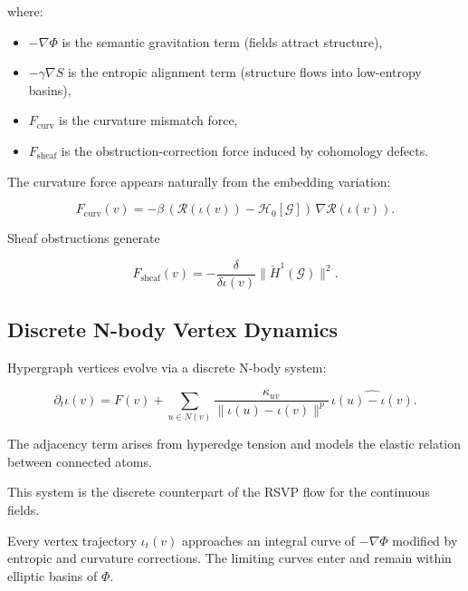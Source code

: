 where:

\begin{itemize}
\item $-\nabla\Phi$ is the semantic gravitation term (fields attract structure),
\item $-\gamma\nabla S$ is the entropic alignment term (structure flows into low-entropy basins),
\item $F_{\mathrm{curv}}$ is the curvature mismatch force,
\item $F_{\mathrm{sheaf}}$ is the obstruction-correction force induced by cohomology defects.
\end{itemize}

The curvature force appears naturally from the embedding variation:

\begin{equation}
F_{\mathrm{curv}}(v)
  = -\beta\,(\mathcal{R}(\iota(v)) - \mathcal{H}_0[\mathcal{G}])\,\nabla\mathcal{R}(\iota(v)).
\end{equation}

Sheaf obstructions generate

\begin{equation}
F_{\mathrm{sheaf}}(v)
  = -\frac{\delta}{\delta\iota(v)} \bigl\|\check{H}^1(\mathcal{G})\bigr\|^2.
\end{equation}

\subsection{Discrete N-body Vertex Dynamics}

Hypergraph vertices evolve via a discrete N-body system:

\begin{equation}
\label{eq:vertex-evolution}
\partial_t\iota(v)
  = F(v)
  + \sum_{u\in N(v)}
      \frac{\kappa_{uv}}{\|\iota(u)-\iota(v)\|^p}
      \,\widehat{\iota(u)-\iota(v)}.
\end{equation}

The adjacency term arises from hyperedge tension and models the elastic relation
between connected atoms.

This system is the discrete counterpart of the RSVP flow for the continuous
fields.

\begin{theorem}
Every vertex trajectory $\iota_t(v)$ approaches an integral curve of
$-\nabla\Phi$ modified by entropic and curvature corrections.  
The limiting curves enter and remain within elliptic basins of $\Phi$.
\end{theorem}

